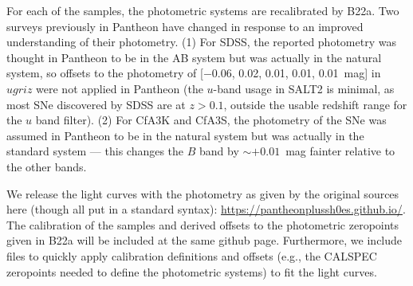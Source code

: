 \documentclass[twocolumn]{aastex63}
\begin{document}
For each of the samples, the photometric systems are recalibrated by B22a.  Two surveys previously in Pantheon have changed in response to an improved understanding of their photometry. (1) For SDSS, the reported photometry was thought in Pantheon to be in the AB system but was actually in the natural system, so offsets to the photometry of [$-0.06$, 0.02, 0.01, 0.01, 0.01~mag] in $ugriz$ were not applied in Pantheon (the $u$-band usage in SALT2 is minimal, as most SNe discovered by SDSS are at $z>0.1$, outside the usable redshift range for the $u$ band filter). (2) For CfA3K and CfA3S, the photometry of the SNe was assumed in Pantheon to be in the natural system but was actually in the standard system --- this changes the $B$ band by $\sim+0.01$~mag fainter relative to the other bands.


We release the light curves with the photometry as given by the original sources here (though all put in a standard syntax): \url{ https://pantheonplussh0es.github.io/}. The calibration of the samples and derived offsets to the photometric zeropoints given in B22a will be included at the same github page.  Furthermore, we include files to quickly apply calibration definitions and offsets (e.g., the CALSPEC zeropoints needed to define the photometric systems) to fit the light curves.
\end{document}
